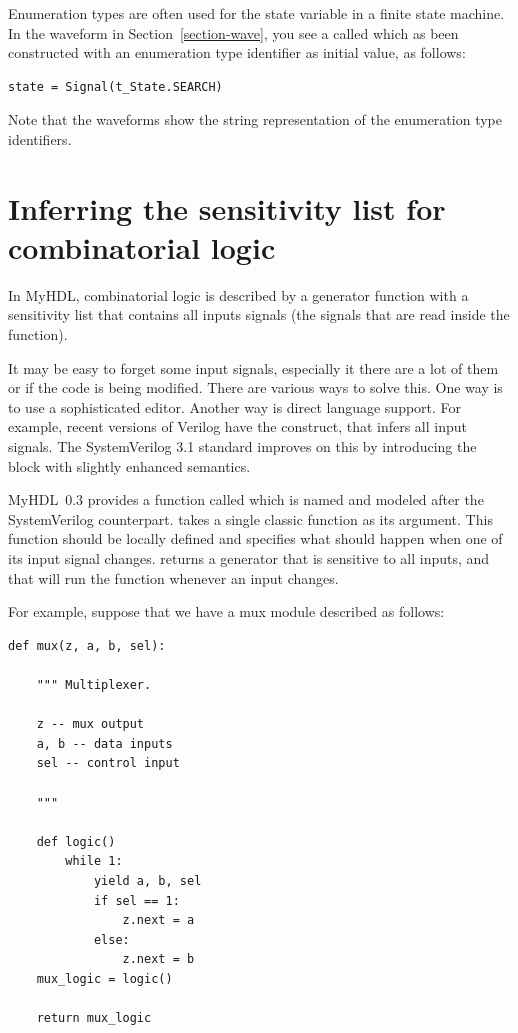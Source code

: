 \documentclass{howto}
\newcommand{\myhdl}{\protect \mbox{MyHDL}}
\begin{document}
Enumeration types are often used for the state variable in a finite
state machine.  In the waveform in Section~\ref{section-wave}, you see
a  called  which as been constructed with an
enumeration type identifier as initial value, as follows:

\begin{verbatim}
state = Signal(t_State.SEARCH)
\end{verbatim}

Note that the waveforms show the string representation of the
enumeration type identifiers. 


\section{Inferring the sensitivity list for combinatorial
logic\label{section-combinatorial}}

In \myhdl{}, combinatorial logic is described by a generator function with
a sensitivity list that contains all inputs signals (the signals that
are read inside the function).

It may be easy to forget some input signals, especially it there are a
lot of them or if the code is being modified. There are various ways
to solve this. One way is to use a sophisticated editor. Another way
is direct language support. For example, recent versions of Verilog
have the  construct, that infers all input
signals. The SystemVerilog 3.1 standard improves on this by
introducing the  block with slightly enhanced
semantics.

\myhdl\ 0.3 provides a function called  which
is named and modeled after the SystemVerilog counterpart.
 takes a single classic function as its
argument. This function should be locally defined and specifies what
should happen when one of its input signal
changes.  returns a generator that is
sensitive to all inputs, and that will run the function whenever an
input changes.

For example, suppose that we have a mux module described as follows:

\begin{verbatim}
def mux(z, a, b, sel):

    """ Multiplexer.
    
    z -- mux output
    a, b -- data inputs
    sel -- control input

    """

    def logic()
        while 1:
            yield a, b, sel
            if sel == 1:
                z.next = a
            else:
                z.next = b
    mux_logic = logic()

    return mux_logic
\end{verbatim}
\end{document}
